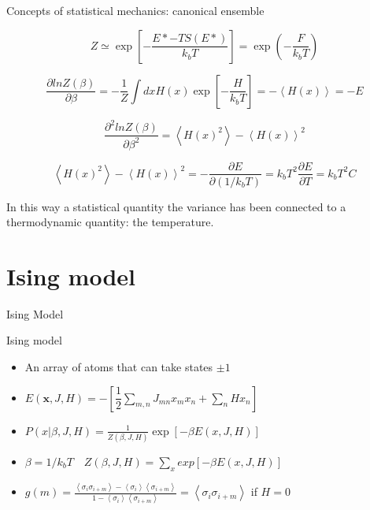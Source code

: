 \documentclass{beamer}
\begin{document}
\begin{frame}{Concepts of statistical mechanics: canonical ensemble\cite{peliti2011statistical} }

\begin{equation}
Z\simeq \exp\left[-\dfrac{E*-TS(E*)}{k_{b}T} \right]=\exp\left( - \frac{F}{k_{b}T}  \right)     
\end{equation}

\begin{equation}
\dfrac{\partial ln Z(\beta)}{\partial \beta}=-\dfrac{1}{Z}\int dx H(x)\exp\left[  -\dfrac{H}{k_{b}T}\right]=-\left\langle H(x) \right\rangle=-E
\end{equation}

\begin{equation}
\dfrac{\partial^{2} ln Z(\beta)}{\partial \beta^{2}}=\left\langle H(x)^{2} \right\rangle-\left\langle H(x) \right\rangle^{2}
\end{equation}

\begin{equation}
\left\langle H(x)^{2} \right\rangle-\left\langle H(x) \right\rangle^{2}=-\dfrac{\partial E}{\partial (1/k_{b}T)}=k_{b}T^{2}\dfrac{\partial E}{\partial T}=k_{b}T^{2}C
\end{equation}

In this way a statistical quantity the variance has been connected to a thermodynamic quantity: the temperature.

\end{frame}

\section{Ising model}

\begin{frame}{}
\begin{center}
{\Huge Ising Model}
\end{center}
\end{frame}


\begin{frame}{Ising model \cite{mackay2003information,slides}}
\begin{itemize}
\item An array of atoms that can take states $\pm 1$
\item $E(\textbf{x},J,H)= - \left[\dfrac{1}{2}\sum_{m,n}J_{mn}x_{m}x_{n}+\sum_{n}Hx_{n} \right]$
\item $P(x|\beta,J,H)=\frac{1}{Z(\beta,J,H)}\exp[-\beta E(x,J,H)]$
\item $\beta=1/k_{b}T\quad Z(\beta,J,H)=\sum_{x}exp\left[-\beta E(x,J,H)\right]$
\item $g(m)=\frac{\left\langle \sigma_{i}\sigma_{i+m}  \right\rangle - \left\langle \sigma_{i} \right\rangle \left\langle \sigma_{i+m} \right\rangle  }{1- \left\langle \sigma_{i} \right\rangle \left\langle \sigma_{i+m} \right\rangle }=\left\langle \sigma_{i}\sigma_{i+m}  \right\rangle $ if $H=0$
\end{itemize}
\end{frame}
\end{document}
